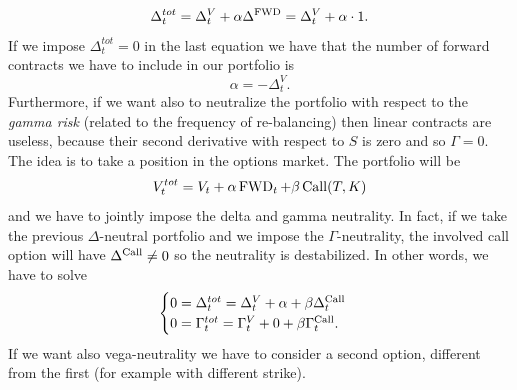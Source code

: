 \begin{equation}
    \Delta_t^{tot} = \Delta_t^V + \alpha\Delta^{\operatorname{FWD}} = \Delta_t^V + \alpha\cdot 1.
\end{equation}
If we impose $\Delta_t^{tot}=0$ in the last equation we have that the number of forward contracts we have to include in our portfolio is
\begin{equation}
    \alpha = -\Delta^V_t.
\end{equation}
Furthermore, if we want also to neutralize the portfolio with respect to the \emph{gamma risk} (related to the frequency of re-balancing) then linear contracts are useless, because their second derivative with respect to $S$ is zero and so $\Gamma=0$. The idea is to take a position in the options market. The portfolio will be
\begin{equation}
    V^{tot}_t = V_t + \alpha\operatorname{FWD}_t + \beta \operatorname{Call}(T,K)
\end{equation}
and we have to jointly impose the delta and gamma neutrality. In fact, if we take the previous $\Delta$-neutral portfolio and we impose the $\Gamma$-neutrality, the involved call option will have $\Delta^{\operatorname{Call}}\ne0$ so the neutrality is destabilized. In other words, we have to solve
\begin{equation}
    \begin{cases}
    0 = \Delta^{tot}_t = \Delta_t^V + \alpha + \beta\Delta^{\operatorname{Call}}_t \\
    0 = \Gamma^{tot}_t = \Gamma^V_t + 0 + \beta \Gamma^{\operatorname{Call}}_t.
    \end{cases}
\end{equation}
If we want also vega-neutrality we have to consider a second option, different from the first (for example with different strike).
